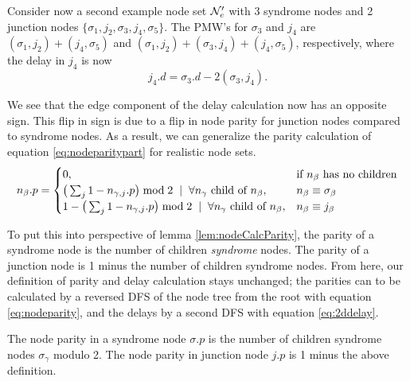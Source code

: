 Consider now a second example node set $\mathcal{N}_e'$ with 3 syndrome nodes and 2 junction nodes $\{\sigma_1, j_2, \sigma_3, j_4, \sigma_5\}$. The PMW's for $\sigma_3$ and $j_4$ are $(\sigma_1, j_2) + (j_4, \sigma_5)$ and  $(\sigma_1, j_2) + (\sigma_3, j_4) + (j_4, \sigma_5)$, respectively, where the delay in $j_4$ is now
\begin{equation*}
  j_4.d = \sigma_3.d - 2(\sigma_3, j_4).
\end{equation*}

We see that the edge component of the delay calculation now has an opposite sign. This flip in sign is due to a flip in node parity for junction nodes compared to syndrome nodes. As a result, we can generalize the parity calculation of equation \ref{eq:nodeparitypart} for realistic node sets.
\begin{equation}\label{eq:nodeparity}
  n_\beta.p =
  \begin{cases}
    0, & \mbox{if $n_\beta$ has no children}  \\
    \big( \sum_{j} 1-n_{\gamma,j}.p \big ) \bmod 2 \hspace{.2cm} | \hspace{.2cm} \forall n_\gamma \mbox{ child of } n_\beta, & n_\beta \equiv \sigma_\beta \\
    1 - \big( \sum_{j} 1-n_{\gamma,j}.p \big ) \bmod 2 \hspace{.2cm} | \hspace{.2cm} \forall n_\gamma \mbox{ child of } n_\beta, & n_\beta \equiv j_\beta
  \end{cases}
\end{equation}

To put this into perspective of lemma \ref{lem:nodeCalcParity}, the parity of a syndrome node is the number of children \emph{syndrome} nodes. The parity of a junction node is 1 minus the number of children syndrome nodes. From here, our definition of parity and delay calculation stays unchanged; the parities can to be calculated by a reversed DFS of the node tree from the root with equation \ref{eq:nodeparity}, and the delays by a second DFS with equation \ref{eq:2ddelay}.

\begin{lemma}\label{lem:nodecalc_junction}
  The node parity in a syndrome node $\sigma.p$ is the number of children syndrome nodes $\sigma_\gamma$ modulo 2. The node parity in junction node $j.p$ is 1 minus the above definition.
\end{lemma}

